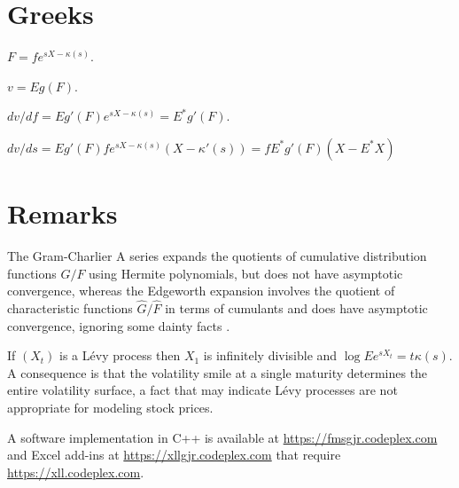 \documentclass[12pt]{article}
\theoremstyle{definition}
\begin{document}
\section{Greeks}

$F = fe^{sX - \kappa(s)}$.

$v = E g(F)$.

$dv/df = Eg'(F) e^{sX - \kappa(s)} = E^*g'(F)$.

$dv/ds = E g'(F) fe^{sX - \kappa(s)} (X - \kappa'(s))
       = fE^* g'(F) (X - E^*X)$

\section{Remarks}
The Gram-Charlier A series expands the quotients of cumulative
distribution functions \(G/F\) using Hermite polynomials, but does not
have asymptotic convergence, whereas the Edgeworth expansion involves
the quotient of characteristic functions \(\hat G/\hat F\) in terms of
cumulants and does have asymptotic convergence, ignoring some dainty
facts \cite{Pet1975}.

If \((X_t)\) is a L\'evy process then \(X_1\) is
infinitely divisible and \(\log Ee^{sX_t} = t\kappa(s)\).
A consequence is that the volatility smile at a single
maturity determines the entire volatility surface, a fact that
may indicate L\'evy processes are not appropriate for
modeling stock prices.

A software implementation in C++ is available at
\url{https://fmsgjr.codeplex.com} and Excel add-ins
at \url{https://xllgjr.codeplex.com} that require
\url{https://xll.codeplex.com}.



\end{document}
